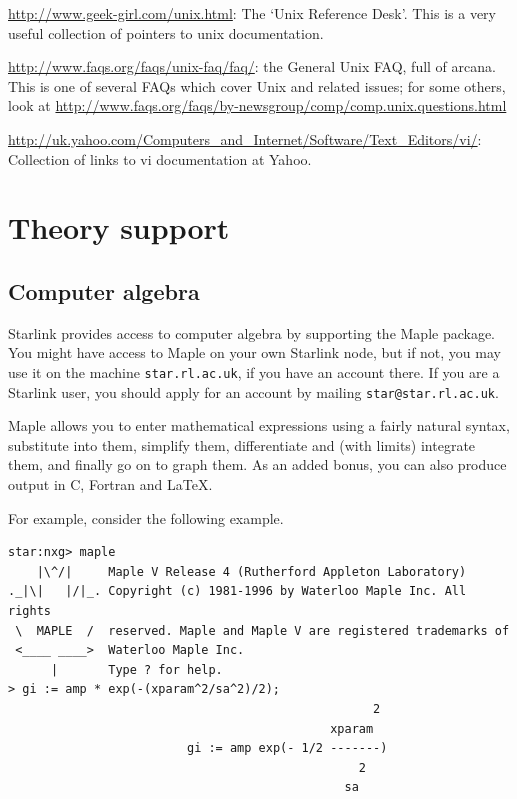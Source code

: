 \documentclass[11pt,oneside,chapters]{starlink}
\begin{document}
\begin{itemize}
\url{http://www.geek-girl.com/unix.html}: The `Unix
Reference Desk'.  This is a very useful collection of
pointers to unix documentation.


\url{http://www.faqs.org/faqs/unix-faq/faq/}:
the General Unix FAQ, full of arcana.  This is one of several FAQs
which cover Unix and related issues; for some others, look at
\url{http://www.faqs.org/faqs/by-newsgroup/comp/comp.unix.questions.html}

\url{http://uk.yahoo.com/Computers_and_Internet/Software/Text_Editors/vi/}:
Collection of links to vi documentation at Yahoo.
\end{itemize}

\chapter{Theory support}
\label{s:theory}

\section{Computer algebra}
\label{s:maple}

Starlink provides access to computer algebra by supporting
the Maple package.  You might have access to Maple on your
own Starlink node, but if not, you may use it on the machine
\texttt{star.rl.ac.uk}, if you have an account there.
If you are a Starlink user, you should apply for an account
by mailing \texttt{star@star.rl.ac.uk}.

Maple allows you to enter mathematical expressions using a
fairly natural syntax, substitute into them, simplify them,
differentiate and (with limits) integrate them, and finally
go on to graph them.  As an added bonus, you can also
produce output in C, Fortran and LaTeX.

For example, consider the following example.

\begin{verbatim}
star:nxg> maple
    |\^/|     Maple V Release 4 (Rutherford Appleton Laboratory)
._|\|   |/|_. Copyright (c) 1981-1996 by Waterloo Maple Inc. All rights
 \  MAPLE  /  reserved. Maple and Maple V are registered trademarks of
 <____ ____>  Waterloo Maple Inc.
      |       Type ? for help.
> gi := amp * exp(-(xparam^2/sa^2)/2);
                                                   2
                                             xparam
                         gi := amp exp(- 1/2 -------)
                                                 2
                                               sa
\end{verbatim}
\end{document}

